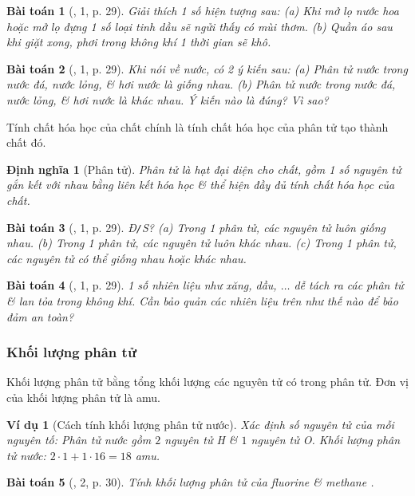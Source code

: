 \documentclass{article}
\newtheorem{baitoan}{Bài toán}
\newtheorem{dinhnghia}{Định nghĩa}
\newtheorem{vidu}{Ví dụ}
\begin{document}
\begin{baitoan}[\cite{SGK_KHTN_7_Canh_Dieu}, 1, p. 29]
	Giải thích 1 số hiện tượng sau: (a) Khi mở lọ nước hoa hoặc mở lọ đựng 1 số loại tinh dầu sẽ ngửi thấy có mùi thơm. (b) Quần áo sau khi giặt xong, phơi trong không khí 1 thời gian sẽ khô.
\end{baitoan}

\begin{baitoan}[\cite{SGK_KHTN_7_Canh_Dieu}, 1, p. 29]
	Khi nói về nước, có 2 ý kiến sau: (a) Phân tử nước trong nước đá, nước lỏng, \& hơi nước là giống nhau. (b) Phân tử nước trong nước đá, nước lỏng, \& hơi nước là khác nhau. Ý kiến nào là đúng? Vì sao?
\end{baitoan}
Tính chất hóa học của chất chính là tính chất hóa học của phân tử tạo thành chất đó.

\begin{dinhnghia}[Phân tử]
	\emph{Phân tử} là hạt đại diện cho chất, gồm 1 số nguyên tử gắn kết với nhau bằng liên kết hóa học \& thể hiện đầy đủ tính chất hóa học của chất.
\end{dinhnghia}

\begin{baitoan}[\cite{SGK_KHTN_7_Canh_Dieu}, 1, p. 29]
	\emph{Đ\texttt{/}S?} (a) Trong 1 phân tử, các nguyên tử luôn giống nhau. (b) Trong 1 phân tử, các nguyên tử luôn khác nhau. (c) Trong 1 phân tử, các nguyên tử có thể giống nhau hoặc khác nhau.
\end{baitoan}

\begin{baitoan}[\cite{SGK_KHTN_7_Canh_Dieu}, 1, p. 29]
	1 số nhiên liệu như xăng, dầu, $\ldots$ dễ tách ra các phân tử \& lan tỏa trong không khí. Cần bảo quản các nhiên liệu trên như thế nào để bảo đảm an toàn?
\end{baitoan}

\subsubsection{Khối lượng phân tử}
Khối lượng phân tử bằng tổng khối lượng các nguyên tử có trong phân tử. Đơn vị của khối lượng phân tử là amu.

\begin{vidu}[Cách tính khối lượng phân tử nước]
	Xác định số nguyên tử của mỗi nguyên tố: Phân tử nước gồm $2$ nguyên tử \emph{H} \& $1$ nguyên tử \emph{O}. Khối lượng phân tử nước: $2\cdot1 +1\cdot16 = 18$ amu.
\end{vidu}

\begin{baitoan}[\cite{SGK_KHTN_7_Canh_Dieu}, 2, p. 30]
	Tính khối lượng phân tử của fluorine \emph{} \& methane \emph{}.
\end{baitoan}
\end{document}
